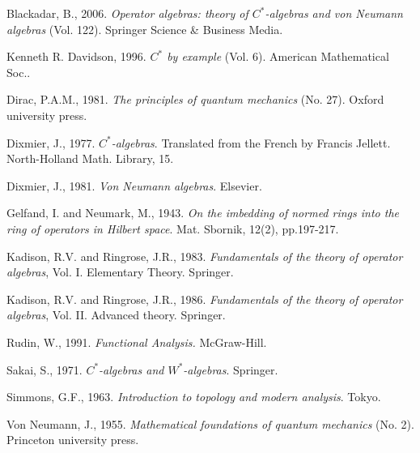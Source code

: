 \documentclass[11pt,a4paper]{report}
\theoremstyle{plain}
\theoremstyle{definition}
\newcommand{\1}{\mathbbm{1}}
\begin{document}
\begin{thebibliography}{00}
	Blackadar, B., 2006. 
	\emph{Operator algebras: theory of $C^\ast$-algebras and von Neumann algebras} (Vol. 122). 
	Springer Science \& Business Media.

	Kenneth R. Davidson, 1996. 
	\emph{$C^\ast$ by example} (Vol. 6). 
	American Mathematical Soc..

	Dirac, P.A.M., 1981. 
	\emph{The principles of quantum mechanics} (No. 27). 
	Oxford university press.

	Dixmier, J., 1977. \emph{$C^\ast$-algebras}. 
	Translated from the French by Francis Jellett. 
	North-Holland Math. Library, 15.
	
	Dixmier, J., 1981. 
	\emph{Von Neumann algebras}. 
	Elsevier.

	Gelfand, I. and Neumark, M., 1943. 
	\emph{On the imbedding of normed rings into the ring of operators in Hilbert space}. 
	Mat. Sbornik, 12(2), pp.197-217.
	
	Kadison, R.V. and Ringrose, J.R., 1983. 
	\emph{Fundamentals of the theory of operator algebras}, Vol. I. Elementary Theory. 
	Springer.

	Kadison, R.V. and Ringrose, J.R., 1986. 
	\emph{Fundamentals of the theory of operator algebras}, Vol. II. Advanced theory. 
	Springer.

	Rudin, W., 1991. 
	\emph{Functional Analysis.} 
	McGraw-Hill.

	Sakai, S., 1971. 
	\emph{$C^\ast$-algebras and $W^\ast$-algebras}. 
	Springer.
	
	Simmons, G.F., 1963. 
	\emph{Introduction to topology and modern analysis}. 
	Tokyo.

	Von Neumann, J., 1955.
	\emph{Mathematical foundations of quantum mechanics} (No. 2). 
	Princeton university press.
	
\end{thebibliography}
\end{document}
